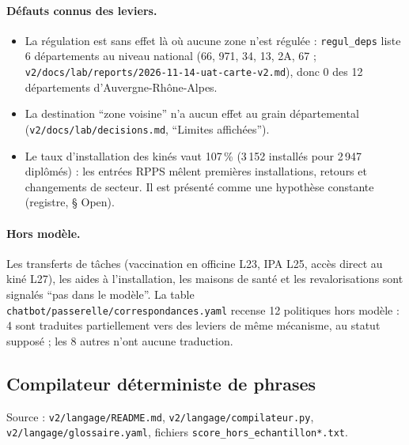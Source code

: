 \paragraph{Défauts connus des leviers.}
\begin{itemize}
\item La régulation est sans effet là où aucune zone n'est régulée : \texttt{regul\_\allowbreak{}deps} liste 6\mesure{} départements au niveau national (66, 971, 34, 13, 2A, 67 ; \texttt{v2/\allowbreak{}docs/\allowbreak{}lab/\allowbreak{}reports/\allowbreak{}2026-\allowbreak{}11-\allowbreak{}14-\allowbreak{}uat-\allowbreak{}carte-\allowbreak{}v2.md}), donc 0\derive{} des 12\mesure{} départements d'Auvergne-Rhône-Alpes.
\item La destination \enquote{zone voisine} n'a aucun effet au grain départemental (\texttt{v2/\allowbreak{}docs/\allowbreak{}lab/\allowbreak{}decisions.md}, \enquote{Limites affichées}).
\item Le taux d'installation des kinés vaut 107\mesure{}\,\% (3\,152\mesure{} installés pour 2\,947\mesure{} diplômés) : les entrées RPPS mêlent premières installations, retours et changements de secteur. Il est présenté comme une hypothèse constante (registre, § Open).
\end{itemize}

\paragraph{Hors modèle.}
Les transferts de tâches (vaccination en officine L23, IPA L25, accès direct au kiné L27), les aides à l'installation, les maisons de santé et les revalorisations sont signalés \enquote{pas dans le modèle}.
La table \texttt{chatbot/\allowbreak{}passerelle/\allowbreak{}correspondances.yaml} recense 12\mesure{} politiques hors modèle : 4\mesure{} sont traduites partiellement vers des leviers de même mécanisme, au statut supposé ; les 8\mesure{} autres n'ont aucune traduction.

\subsection{Compilateur déterministe de phrases}\label{pro:compilateur}

Source : \texttt{v2/\allowbreak{}langage/\allowbreak{}README.md}, \texttt{v2/\allowbreak{}langage/\allowbreak{}compilateur.py}, \texttt{v2/\allowbreak{}langage/\allowbreak{}glossaire.yaml}, fichiers \texttt{score\_\allowbreak{}hors\_\allowbreak{}echantillon*.txt}.

